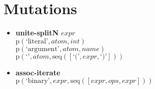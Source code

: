 \section{Mutations}
{\footnotesize\begin{itemize}
\item \textbf{unite-splitN} $expr$ \\$\mathrm{p}\left(\text{`literal'},\mathit{atom},\mathit{int}\right)$\\$\mathrm{p}\left(\text{`argument'},\mathit{atom},\mathit{name}\right)$\\$\mathrm{p}\left(\text{`'},\mathit{atom},\mathrm{seq}\left(\left[\text{`('}, \mathit{expr}, \text{`)'}\right]\right)\right)$
\item \textbf{assoc-iterate}\\$\mathrm{p}\left(\text{`binary'},\mathit{expr},\mathrm{seq}\left(\left[\mathit{expr}, \mathit{ops}, \mathit{expr}\right]\right)\right)$
\end{itemize}}

